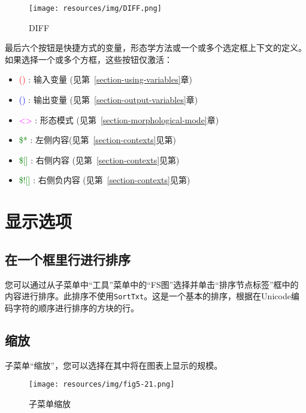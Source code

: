 \begin{figure}[!h]
\begin{center}
\texttt{[image: resources/img/DIFF.png]}
\caption{DIFF\label{Graph-DIFF}}
\end{center}
\end{figure}

\bigskip
\noindent
最后六个按钮是快捷方式的变量，形态学方法或一个或多个选定框上下文的定义。如果选择一个或多个方框，这些按钮仅激活：
\begin{itemize}
\item \textcolor{red}{()}  : 输入变量	(见第~\ref{section-using-variables}章)
\item \textcolor{blue}{()} : 输出变量 (见第~\ref{section-output-variables}章)
\item \textcolor{magenta}{<>} : 形态模式 (见第~\ref{section-morphological-mode}章)
\item \textcolor{green}{\$*} : 左侧内容(见第~\ref{section-contexts}见第)
\item \textcolor{green}{\$[]} : 右侧内容 (见第~\ref{section-contexts}见第)
\item \textcolor{green}{\$![]} : 右侧负内容 (见第~\ref{section-contexts}见第)
\end{itemize}




\section{显示选项}

\subsection{在一个框里行进行排序}
您可以通过从子菜单中“工具”菜单中的“FS图”选择并单击“排序节点标签”框中的内容进行排序。此排序不使用\verb+SortTxt+。这是一个基本的排序，根据在Unicode编码字符的顺序进行排序的方块的行。


\subsection{缩放}
子菜单“缩放”，您可以选择在其中将在图表上显示的规模。

\bigskip
\begin{figure}[h]
\begin{center}
\texttt{[image: resources/img/fig5-21.png]}
\caption{子菜单缩放}
\end{center}
\end{figure}

